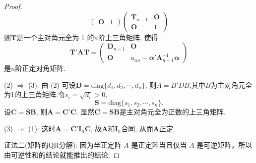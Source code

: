 \documentclass[../../main.tex]{subfiles}
\begin{document}
\begin{proof}
\[\begin{pmatrix}
\boldsymbol{O} & 1
\end{pmatrix}
\begin{pmatrix}
\boldsymbol{T}_{n - 1} & \boldsymbol{O} \\
\boldsymbol{O} & 1
\end{pmatrix}
\]
则$\boldsymbol{T}$是一个主对角元全为 1 的$n$阶上三角矩阵, 使得
\[
\boldsymbol{T}'\boldsymbol{A}\boldsymbol{T}=\begin{pmatrix}
\boldsymbol{D}_{n - 1} & \boldsymbol{O} \\
\boldsymbol{O} & a_{nn}-\boldsymbol{\alpha}'\boldsymbol{A}_{n - 1}^{-1}\boldsymbol{\alpha}
\end{pmatrix}
\]
是$n$阶正定对角矩阵.

(2) $\Rightarrow$ (3): 由 (2) 可设$\boldsymbol{D}=\text{diag}\{d_1, d_2, \cdots, d_n\}$, 则$A=B'DB$,其中$B$为主对角元全为1的上三角矩阵.令$s_i = \sqrt{d_i}>0$,
\[
\boldsymbol{S}=\text{diag}\{s_1, s_2, \cdots, s_n\}.
\]
设$\boldsymbol{C}=\boldsymbol{S}\boldsymbol{B}$, 则$\boldsymbol{A}=\boldsymbol{C}'\boldsymbol{C}$. 显然$\boldsymbol{C}=\boldsymbol{S}\boldsymbol{B}$是主对角元全为正数的上三角矩阵.

(3) $\Rightarrow$ (1): 这时$\boldsymbol{A}=\boldsymbol{C}'\boldsymbol{I}_n\boldsymbol{C}$, 故$\boldsymbol{A}$和$\boldsymbol{I}_n$合同, 从而$\boldsymbol{A}$正定.

{\color{blue}证法二(矩阵的QR分解):}
因为半正定阵 $A$ 是正定阵当且仅当 $A$ 是可逆矩阵，所以由可逆性和的结论就能推出的结论.
\end{proof}
\end{document}
